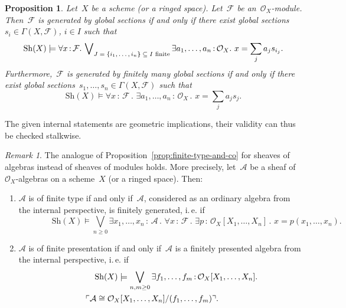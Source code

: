 \documentclass[10pt,reqno,a4paper]{amsbook}
\makeatletter
\theoremstyle{definition}
\theoremstyle{plain}
\newtheorem{prop}[defn]{Proposition}
\theoremstyle{remark}
\newtheorem{rem}[defn]{Remark}
\newcommand{\A}{\mathcal{A}}
\newcommand{\F}{\mathcal{F}}
\renewcommand{\O}{\mathcal{O}}
\newcommand{\Sh}{\mathrm{Sh}}
\newcommand{\?}{\,{:}\,}
\renewcommand{\_}{\mathpunct{.}\,}
\newcommand{\speak}[1]{\ulcorner\text{\textnormal{#1}}\urcorner}
\newcommand{\ie}{i.\,e.\@\xspace}
\renewenvironment{proof}[1][\proofname]{\par
  \pushQED{\qed}%
  \normalfont \topsep6\p@\@plus6\p@\relax
  \trivlist
  \item[\hskip\labelsep
        \itshape
    #1\@addpunct{.}]\ignorespaces
}{%
  \popQED\endtrivlist\@endpefalse
}
\makeatother
\begin{document}
\begin{prop}Let~$X$ be a scheme (or a ringed space). Let~$\F$ be
an~$\O_X$-module. Then~$\F$ is generated by global sections if and only if
there exist global sections~$s_i \in \Gamma(X,\F)$, $i \in I$ such that
\[ \Sh(X) \models \forall x\?\F\_ \bigvee\nolimits_{\textnormal{$J=\{i_1,\ldots,i_n\} \subseteq I$ finite}}
  \exists a_1,\ldots,a_n\?\O_X\_
  x = \sum_j a_j s_{i_j}. \]
Furthermore,~$\F$ is generated by finitely many global sections if and only if
there exist global sections~$s_1,\ldots,s_n \in \Gamma(X,\F)$ such that
\[ \Sh(X) \models \forall x\?\F\_ \exists a_1,\ldots,a_n\?\O_X\_ x = \sum_j a_j
s_j. \]
\end{prop}
\begin{proof}The given internal statements are geometric implications, their
validity can thus be checked stalkwise.\end{proof}

\begin{rem}The analogue of Proposition~\ref{prop:finite-type-and-co} for
sheaves of algebras instead of sheaves of modules holds. More precisely,
let~$\A$ be a sheaf of~$\O_X$-algebras on a scheme~$X$ (or a ringed space).
Then:
\begin{enumerate}
\item $\A$ is of finite type if and only if~$\A$, considered as an ordinary
algebra from the internal perspective, is finitely generated, \ie if
\[ {\qquad\qquad} \Sh(X) \models
  \bigvee_{n \geq 0}
  \exists x_1,\ldots,x_n\?\A\_
  \forall x\?\F\_
  \exists p\?\O_X[X_1,\ldots,X_n]\_
  x = p(x_1,\ldots,x_n). \]
\item $\A$ is of finite presentation if and only if~$\A$ is a finitely
presented algebra from the internal perspective, \ie if
\begin{multline*}
  {\qquad\qquad} \Sh(X) \models \bigvee_{n,m \geq 0}
  \exists f_1,\ldots,f_m \? \O_X[X_1,\ldots,X_n]\_ \\
  \speak{$\A \cong \O_X[X_1,\ldots,X_n]/(f_1,\ldots,f_m)$}. \qquad
\end{multline*}
\end{enumerate}
\end{rem}
\end{document}
